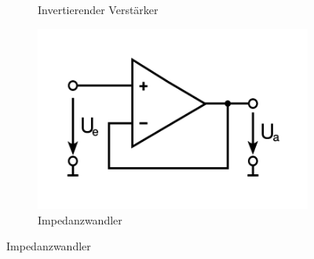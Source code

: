 \begin{figure}[h]
\begin{subfigure}{0.25\textwidth}
		\caption{Invertierender Verstärker}
	\end{subfigure}
	\begin{subfigure}{0.25\textwidth}
		\includegraphics[width=\textwidth]{images/impedanzwandler}
		\caption{Impedanzwandler}
	\end{subfigure}
	\end{figure}
	
